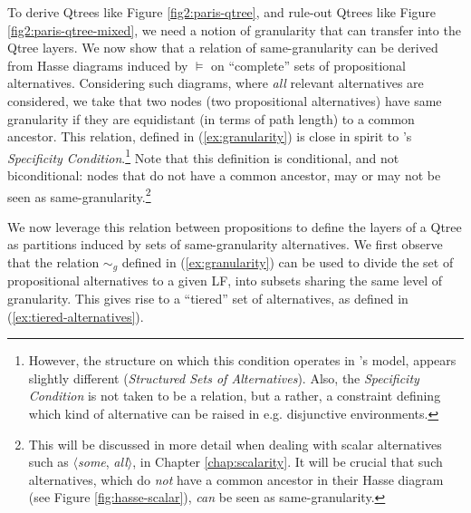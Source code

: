 To derive Qtrees like Figure \ref{fig2:paris-qtree}, and rule-out Qtrees like Figure \ref{fig2:paris-qtree-mixed}, we need a notion of granularity that can transfer into the Qtree layers. We now show that a relation of same-granularity can be derived from Hasse diagrams induced by $\vDash$ on ``complete'' sets of propositional alternatives. Considering such diagrams, where \textit{all} relevant alternatives are considered, we take that two nodes (two propositional alternatives) have same granularity if they are equidistant (in terms of path length) to a common ancestor. This relation, defined in (\ref{ex:granularity}) is close in spirit to \citet{Ippolito2019}'s \textit{Specificity Condition}.\footnote{However, the structure on which this condition operates in \citeauthor{Ippolito2019}'s model, appears slightly different (\textit{Structured Sets of Alternatives}). Also, the \textit{Specificity Condition} is not taken to be a relation, but a rather, a constraint defining which kind of alternative can be raised in e.g. disjunctive environments.} Note that this definition is conditional, and not biconditional: nodes that do not have a common ancestor, may or may not be seen as same-granularity.\footnote{This will be discussed in more detail when dealing with scalar alternatives such as $\langle$\textit{some}, \textit{all}$\rangle$, in Chapter \ref{chap:scalarity}. It will be crucial that such alternatives, which do \textit{not} have a common ancestor in their Hasse diagram (see Figure \ref{fig:hasse-scalar}), \textit{can} be seen as same-granularity.}

\begin{exe}
	\label{ex:granularity}
\end{exe}

We now leverage this relation between propositions to define the layers of a Qtree as partitions induced by sets of same-granularity alternatives. We first observe that the relation $\sim_g$ defined in (\ref{ex:granularity}) can be used to divide the set of propositional alternatives to a given LF, into subsets sharing the same level of granularity. This gives rise to a ``tiered'' set of alternatives, as defined in (\ref{ex:tiered-alternatives}). 
\begin{exe}
	 \label{ex:tiered-alternatives}
\end{exe}

